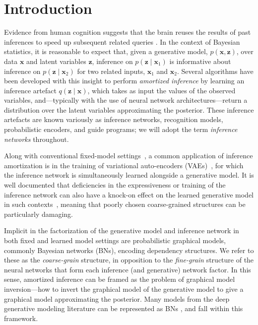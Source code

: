 \section{Introduction}%
\label{sec:intro}
Evidence from human cognition suggests that the brain reuses the results of past inferences to speed up subsequent related queries \citep{Gershman2014}.
In the context of Bayesian statistics, it is reasonable to expect that, given a generative model, $p(\mathbf{x},\mathbf{z})$, over data $\mathbf{x}$ and latent variables $\mathbf{z}$, inference on $p(\mathbf{z}\mid\mathbf{x}_1)$ is informative about inference on $p(\mathbf{z}\mid\mathbf{x}_2)$ for two related inputs, $\mathbf{x}_1$ and $\mathbf{x}_2$.
Several algorithms \citep{KingmaWelling2013, RezendeEtAl2014, StuhlmullerEtAl2013, PaigeWood2016, LeEtAl2016, LeEtAl2017, MaddisonEtAl2017, NaessethEtAl2017} have been developed with this insight to perform \emph{amortized inference} by learning an inference artefact $q(\mathbf{z}\mid\mathbf{x})$, which takes as input the values of the observed variables, and---typically with the use of neural network architectures---return a distribution over the latent variables approximating the posterior.
These inference artefacts are known variously as inference networks, recognition models, probabilistic encoders, and guide programs; we will adopt the term \emph{inference networks} throughout.


Along with conventional fixed-model settings~\citep{StuhlmullerEtAl2013,LeEtAl2016,Ritchie2016,PaigeWood2016},
a common application of inference amortization is in the training of variational auto-encoders (VAEs)~\citep{KingmaWelling2013}, for which the inference network is simultaneously learned alongside a generative model.
It is well documented that deficiencies in the expressiveness or training of the inference network can also have a knock-on effect on the learned generative model in such contexts~\citep{burda2015importance,cremer2017reinterpreting,cremer2018inference,rainforth2018tighter}, meaning that poorly chosen coarse-grained structures can be particularly damaging.

Implicit in the factorization of the generative model and inference network in both fixed and learned model settings are probabilistic graphical models, commonly Bayesian networks (BNs), encoding dependency structures. We refer to these as the \emph{coarse-grain} structure, in opposition to the \emph{fine-grain} structure of the neural networks that form each inference (and generative) network factor.
In this sense, amortized inference can be framed as the problem of graphical model inversion---how to invert the graphical model of the generative model to give a graphical model approximating the posterior. Many models from the deep generative modeling literature can be represented as BNs \citep{KrishnanEtAl2017, GanEtAl2015, Neal1990, KingmaWelling2013, GermainEtAl2015, VanDenOordEtAl2016a, VanDenOordEtAl2016b}, and fall within this framework.

